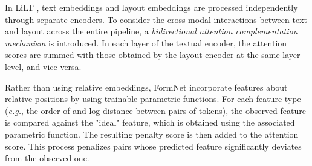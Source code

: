 



In \ac{LiLT} \citep{wang2022lilt}, text embeddings and layout embeddings are processed independently through separate encoders. To consider the cross-modal interactions between text and layout across the entire pipeline, a \textit{bidirectional attention complementation mechanism} is introduced. In each layer of the textual encoder, the attention scores are summed with those obtained by the layout encoder at the same layer level, and vice-versa.   


Rather than using relative embeddings, FormNet \citep{lee2022formnet} incorporate features about relative positions by using trainable parametric functions. For each feature type (\textit{e.g.}, the order of and log-distance between pairs of tokens), the observed feature is compared against the "ideal" feature, which is obtained using the associated parametric function. The resulting penalty score is then added to the attention score. This process penalizes pairs whose predicted feature significantly deviates from the observed one.


